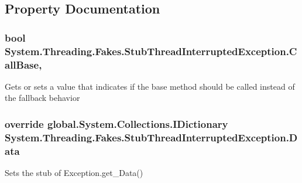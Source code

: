 \subsection{Property Documentation}
\hypertarget{class_system_1_1_threading_1_1_fakes_1_1_stub_thread_interrupted_exception_a16e3dfaaf534e8191dabb0cc447fc5f5}{
\subsubsection[{Call\-Base}]{\setlength{\rightskip}{0pt plus 5cm}bool System.\-Threading.\-Fakes.\-Stub\-Thread\-Interrupted\-Exception.\-Call\-Base\hspace{0.3cm}{\ttfamily [get]}, {\ttfamily [set]}}}\label{class_system_1_1_threading_1_1_fakes_1_1_stub_thread_interrupted_exception_a16e3dfaaf534e8191dabb0cc447fc5f5}


Gets or sets a value that indicates if the base method should be called instead of the fallback behavior

\hypertarget{class_system_1_1_threading_1_1_fakes_1_1_stub_thread_interrupted_exception_a7fe3c5aeb529b8631960adb5b990c121}{
\subsubsection[{Data}]{\setlength{\rightskip}{0pt plus 5cm}override global.\-System.\-Collections.\-I\-Dictionary System.\-Threading.\-Fakes.\-Stub\-Thread\-Interrupted\-Exception.\-Data\hspace{0.3cm}{\ttfamily [get]}}}\label{class_system_1_1_threading_1_1_fakes_1_1_stub_thread_interrupted_exception_a7fe3c5aeb529b8631960adb5b990c121}


Sets the stub of Exception.\-get\-\_\-\-Data()

